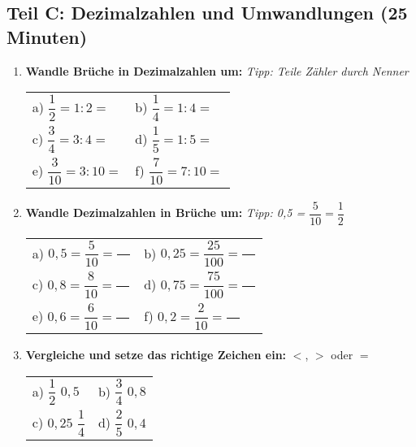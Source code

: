 \subsection*{Teil C: Dezimalzahlen und Umwandlungen (25 Minuten)}

\begin{enumerate}[label=\arabic*.]
    \item \textbf{Wandle Brüche in Dezimalzahlen um:}
    \textit{Tipp: Teile Zähler durch Nenner}

    \vspace{0.5cm}
    \begin{tabular}{ll}
        a) $\dfrac{1}{2} = 1 : 2 =$ \underline{\hspace{3cm}} & b) $\dfrac{1}{4} = 1 : 4 =$ \underline{\hspace{3cm}} \\[2ex]
        c) $\dfrac{3}{4} = 3 : 4 =$ \underline{\hspace{3cm}} & d) $\dfrac{1}{5} = 1 : 5 =$ \underline{\hspace{3cm}} \\[2ex]
        e) $\dfrac{3}{10} = 3 : 10 =$ \underline{\hspace{3cm}} & f) $\dfrac{7}{10} = 7 : 10 =$ \underline{\hspace{3cm}}
    \end{tabular}

    \vspace{1cm}

    \item \textbf{Wandle Dezimalzahlen in Brüche um:}
    \textit{Tipp: 0,5 = $\dfrac{5}{10} = \dfrac{1}{2}$}

    \vspace{0.5cm}
        \begin{tabular}{ll}
        a) $0{,}5 = \dfrac{5}{10} = \dfrac{\phantom{00}}{\phantom{00}}$ & b) $0{,}25 = \dfrac{25}{100} = \dfrac{\phantom{00}}{\phantom{00}}$ \\[3ex]
        c) $0{,}8 = \dfrac{8}{10} = \dfrac{\phantom{00}}{\phantom{00}}$ & d) $0{,}75 = \dfrac{75}{100} = \dfrac{\phantom{00}}{\phantom{00}}$ \\[3ex]
        e) $0{,}6 = \dfrac{6}{10} = \dfrac{\phantom{00}}{\phantom{00}}$ & f) $0{,}2 = \dfrac{2}{10} = \dfrac{\phantom{00}}{\phantom{00}}$
    \end{tabular}

    \vspace{1cm}

    \item \textbf{Vergleiche und setze das richtige Zeichen ein:} $<$, $>$ oder $=$
    
    \vspace{0.5cm}
    \begin{tabular}{ll}
        a) $\dfrac{1}{2}$ \underline{\hspace{1cm}} $0{,}5$ & b) $\dfrac{3}{4}$ \underline{\hspace{1cm}} $0{,}8$ \\[2ex]
        c) $0{,}25$ \underline{\hspace{1cm}} $\dfrac{1}{4}$ & d) $\dfrac{2}{5}$ \underline{\hspace{1cm}} $0{,}4$
    \end{tabular}
\end{enumerate}
